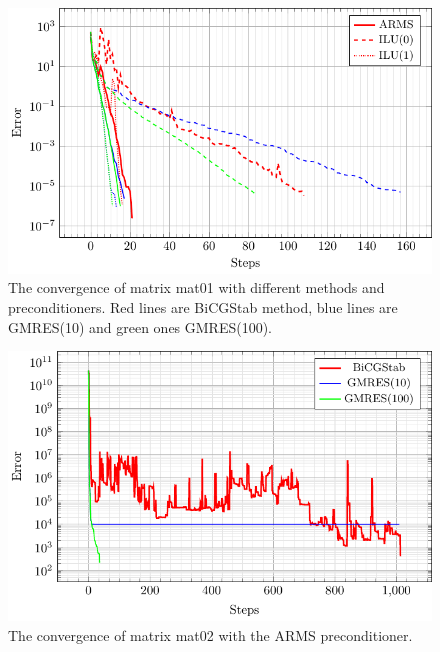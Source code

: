 \documentclass{article}
\begin{document}
	\begin{figure}
		\centering
		\includegraphics[width=\textwidth]{mat01_error.pdf}
		\caption{The convergence of matrix mat01 with different methods and preconditioners. Red lines are BiCGStab method, blue lines are GMRES(10) and green ones GMRES(100).}
		\label{fig:mat01error} 
	\end{figure}
	
	\begin{figure}
		\centering
		\includegraphics[width=\textwidth]{mat02_error.pdf}
		\caption{The convergence of matrix mat02 with the ARMS preconditioner.}
			\label{fig:mat02error} 
	\end{figure}
		
\end{document}
